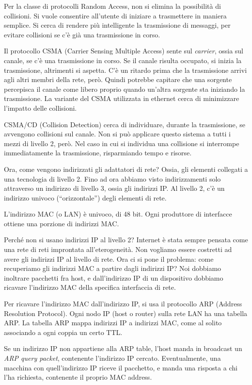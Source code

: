 Per la classe di protocolli Random Access, non si elimina la possibilit\`a di collisioni. Si vuole consentire all'utente di iniziare a trasmettere in maniera semplice. Si cerca di rendere pi\`u intelligente la trasmissione di messaggi, per evitare collisioni se c'\`e gi\`a una trasmissione in corso.

Il protocollo CSMA (Carrier Sensing Multiple Access) sente sul \emph{carrier}, ossia sul canale, se c'\`e una trasmissione in corso. Se il canale risulta occupato, si inizia la trasmissione, altrimenti si aspetta. C'\`e un ritardo prima che la trasmissione arrivi agli altri membri della rete, per\`o. Quindi potrebbe capitare che una sorgente percepisca il canale come libero proprio quando un'altra sorgente sta iniziando la trasmissione. La variante del CSMA utilizzata in ethernet cerca di minimizzare l'impatto delle collisioni.

CSMA/CD (Collision Detection) cerca di individuare, durante la trasmissione, se avvengono collisioni sul canale. Non si pu\`o applicare questo sistema a tutti i mezzi di livello 2, per\`o. Nel caso in cui si individua una collisione si interrompe immediatamente la trasmissione, risparmiando tempo e risorse.

Ora, come vengono indirizzati gli adattatori di rete? Ossia, gli elementi collegati a una tecnologia di livello 2. Fino ad ora abbiamo visto indirizzamenti solo attraverso un indirizzo di livello 3, ossia gli indirizzi IP. Al livello 2, c'\`e un indirizzo univoco (``orizzontale'') degli elementi di rete.

L'indirizzo MAC (o LAN) \`e univoco, di 48 bit. Ogni produttore di interfacce ottiene una porzione di indirizzi MAC.

Perch\'e non si usano indirizzi IP al livello 2? Internet \`e stata sempre pensata come una rete di reti improntata all'eterogeneit\`a. Non vogliamo essere costretti ad avere gli indirizzi IP al livello di rete. Ora ci si pone il problema: come recuperiamo gli indirizzi MAC a partire dagli indirizzi IP? Noi dobbiamo inoltrare pacchetti fra host, e dall'indirizzo IP di un dispositivo dobbiamo ricavare l'indirizzo MAC della specifica interfaccia di rete.

Per ricavare l'indirizzo MAC dall'indirizzo IP, si usa il protocollo ARP (Address Resolution Protocol). Ogni nodo IP (host o router) sulla rete LAN ha una tabella ARP. La tabella ARP mappa indirizzi IP a indirizzi MAC, come al solito associando a ogni coppia un certo TTL.

Se un indirizzo IP non appartiene alla ARP table, l'host manda in broadcast un \emph{ARP query packet}, contenente l'indirizzo IP cercato. Eventualmente, una macchina con quell'indirizzo IP riceve il pacchetto, e manda una risposta a chi l'ha richiesta, contenente il proprio MAC address.

